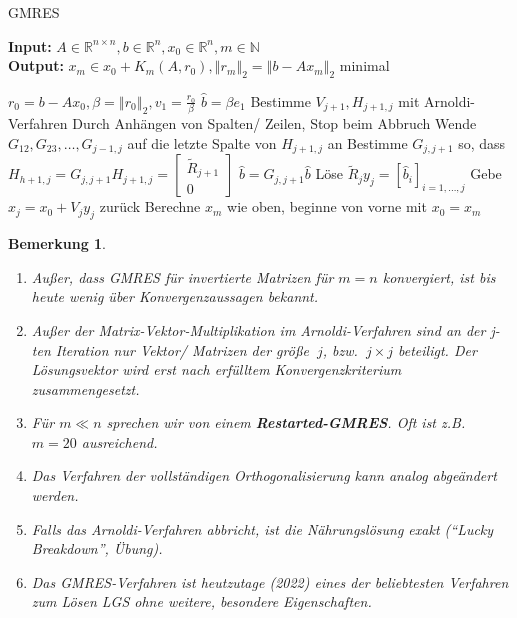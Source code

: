 \documentclass{book}
\newtheorem{remark}[algorithm]{Bemerkung}
\def\R{\mathbb{R}}
\def\N{\mathbb{N}}
\begin{document}
            \begin{algorithm}[H] %
                \caption{GMRES}\label{a3.20}
                \textbf{Input:} $A\in\R^{n\times n},b\in\R^n,x_0\in\R^n,m\in\N$\\
                \textbf{Output:} $x_m\in x_0+K_m(A,r_0),\left\Vert r_m \right\Vert_2=\left\Vert b-Ax_m \right\Vert_2$ minimal
                \begin{algorithmic}
                \State $r_0=b-Ax_0,\beta=\left\Vert r_0 \right\Vert_2,v_1=\frac{r_0}{\beta}$
                \State $\hat{b}=\beta e_1$
                    \State Bestimme $V_{j+1}, H_{j+1,j}$ mit Arnoldi-Verfahren \Comment Durch Anhängen von Spalten/ Zeilen, Stop beim Abbruch
                    \State Wende $G_{12},G_{23},\dots,G_{j-1,j}$ auf die letzte Spalte von $H_{j+1,j}$ an
                    \State Bestimme $G_{j,j+1}$ so, dass $H_{h+1,j}=G_{j,j+1}H_{j+1,j}=\begin{bmatrix}
                        \tilde{R}_{j+1}\\0
                    \end{bmatrix}$
                    \State $\hat{b}=G_{j,j+1}\hat{b}$
                        \State Löse $\tilde{R}_jy_j = [\hat{b}_i]_{i=1,\dots,j}$
                        \State Gebe $x_j=x_0+V_jy_j$ zurück
                    \EndIf
                \EndFor
                \State Berechne $x_m$ wie oben, beginne von vorne mit $x_0=x_m$
                \end{algorithmic}
            \end{algorithm}

            \begin{remark}\label{b3.21}
                \begin{enumerate}
                    \item Außer, dass GMRES für invertierte Matrizen für $m=n$ konvergiert,
                    ist bis heute wenig über Konvergenzaussagen bekannt.
                    \item Außer der Matrix-Vektor-Multiplikation im Arnoldi-Verfahren sind an der j-ten Iteration 
                    nur Vektor/ Matrizen der größe $~j$, bzw. $~j\times j$ beteiligt.
                    Der Lösungsvektor wird erst nach erfülltem Konvergenzkriterium zusammengesetzt.
                    \item Für $m\ll n$ sprechen wir von einem \textbf{Restarted-GMRES}. Oft ist z.B. $m=20$
                    ausreichend.
                    \item Das Verfahren der vollständigen Orthogonalisierung kann analog abgeändert werden.
                    \item Falls das Arnoldi-Verfahren abbricht, ist die Nährungslösung exakt (``Lucky Breakdown'', Übung).
                    \item Das GMRES-Verfahren ist heutzutage (2022) eines der beliebtesten Verfahren zum Lösen LGS ohne
                    weitere, besondere Eigenschaften.
                \end{enumerate}
            \end{remark}
\end{document}

